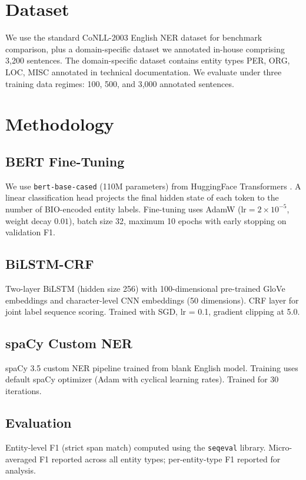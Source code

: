 \documentclass[conference]{IEEEtran}
\begin{document}
\section{Dataset}

We use the standard CoNLL-2003 English NER dataset \cite{sang2003conll} for benchmark comparison, plus a domain-specific dataset we annotated in-house comprising 3,200 sentences. The domain-specific dataset contains entity types PER, ORG, LOC, MISC annotated in technical documentation. We evaluate under three training data regimes: 100, 500, and 3,000 annotated sentences.

\section{Methodology}

\subsection{BERT Fine-Tuning}
We use \texttt{bert-base-cased} (110M parameters) from HuggingFace Transformers \cite{wolf2020transformers}. A linear classification head projects the final hidden state of each token to the number of BIO-encoded entity labels. Fine-tuning uses AdamW ($\text{lr} = 2 \times 10^{-5}$, weight decay $0.01$), batch size 32, maximum 10 epochs with early stopping on validation F1.

\subsection{BiLSTM-CRF}
Two-layer BiLSTM (hidden size 256) with 100-dimensional pre-trained GloVe embeddings and character-level CNN embeddings (50 dimensions). CRF layer for joint label sequence scoring. Trained with SGD, lr = 0.1, gradient clipping at 5.0.

\subsection{spaCy Custom NER}
spaCy 3.5 custom NER pipeline trained from blank English model. Training uses default spaCy optimizer (Adam with cyclical learning rates). Trained for 30 iterations.

\subsection{Evaluation}
Entity-level F1 (strict span match) computed using the \texttt{seqeval} library. Micro-averaged F1 reported across all entity types; per-entity-type F1 reported for analysis.
\end{document}
